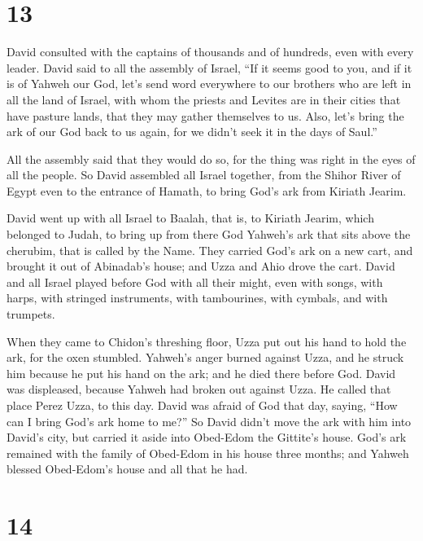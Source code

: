 \hypertarget{section-12}{%
\section{13}\label{section-12}}

 David consulted with the captains of thousands and of
hundreds, even with every leader.  David said to all the
assembly of Israel, ``If it seems good to you, and if it is of Yahweh
our God, let's send word everywhere to our brothers who are left in all
the land of Israel, with whom the priests and Levites are in their
cities that have pasture lands, that they may gather themselves to us.
 Also, let's bring the ark of our God back to us again, for
we didn't seek it in the days of Saul.''

 All the assembly said that they would do so, for the thing
was right in the eyes of all the people.  So David assembled
all Israel together, from the Shihor River of Egypt even to the entrance
of Hamath, to bring God's ark from Kiriath Jearim.

 David went up with all Israel to Baalah, that is, to
Kiriath Jearim, which belonged to Judah, to bring up from there God
Yahweh's ark that sits above the cherubim, that is called by the Name.
 They carried God's ark on a new cart, and brought it out of
Abinadab's house; and Uzza and Ahio drove the cart.  David
and all Israel played before God with all their might, even with songs,
with harps, with stringed instruments, with tambourines, with cymbals,
and with trumpets.

 When they came to Chidon's threshing floor, Uzza put out
his hand to hold the ark, for the oxen stumbled.  Yahweh's
anger burned against Uzza, and he struck him because he put his hand on
the ark; and he died there before God.  David was
displeased, because Yahweh had broken out against Uzza. He called that
place Perez Uzza, to this day.  David was afraid of God
that day, saying, ``How can I bring God's ark home to me?''
 So David didn't move the ark with him into David's city,
but carried it aside into Obed-Edom the Gittite's house. 
God's ark remained with the family of Obed-Edom in his house three
months; and Yahweh blessed Obed-Edom's house and all that he had.

\hypertarget{section-13}{%
\section{14}\label{section-13}}


